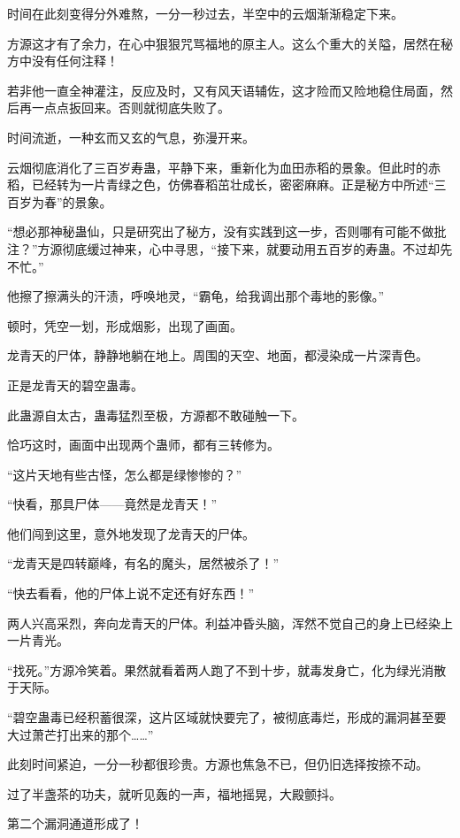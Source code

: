 
\begin{this_body}

时间在此刻变得分外难熬，一分一秒过去，半空中的云烟渐渐稳定下来。

方源这才有了余力，在心中狠狠咒骂福地的原主人。这么个重大的关隘，居然在秘方中没有任何注释！

若非他一直全神灌注，反应及时，又有风天语辅佐，这才险而又险地稳住局面，然后再一点点扳回来。否则就彻底失败了。

时间流逝，一种玄而又玄的气息，弥漫开来。

云烟彻底消化了三百岁寿蛊，平静下来，重新化为血田赤稻的景象。但此时的赤稻，已经转为一片青绿之色，仿佛春稻茁壮成长，密密麻麻。正是秘方中所述“三百岁为春”的景象。

“想必那神秘蛊仙，只是研究出了秘方，没有实践到这一步，否则哪有可能不做批注？”方源彻底缓过神来，心中寻思，“接下来，就要动用五百岁的寿蛊。不过却先不忙。”

他擦了擦满头的汗渍，呼唤地灵，“霸龟，给我调出那个毒地的影像。”

顿时，凭空一划，形成烟影，出现了画面。

龙青天的尸体，静静地躺在地上。周围的天空、地面，都浸染成一片深青色。

正是龙青天的碧空蛊毒。

此蛊源自太古，蛊毒猛烈至极，方源都不敢碰触一下。

恰巧这时，画面中出现两个蛊师，都有三转修为。

“这片天地有些古怪，怎么都是绿惨惨的？”

“快看，那具尸体——竟然是龙青天！”

他们闯到这里，意外地发现了龙青天的尸体。

“龙青天是四转巅峰，有名的魔头，居然被杀了！”

“快去看看，他的尸体上说不定还有好东西！”

两人兴高采烈，奔向龙青天的尸体。利益冲昏头脑，浑然不觉自己的身上已经染上一片青光。

“找死。”方源冷笑着。果然就看着两人跑了不到十步，就毒发身亡，化为绿光消散于天际。

“碧空蛊毒已经积蓄很深，这片区域就快要完了，被彻底毒烂，形成的漏洞甚至要大过萧芒打出来的那个……”

此刻时间紧迫，一分一秒都很珍贵。方源也焦急不已，但仍旧选择按捺不动。

过了半盏茶的功夫，就听见轰的一声，福地摇晃，大殿颤抖。

第二个漏洞通道形成了！


\end{this_body}
